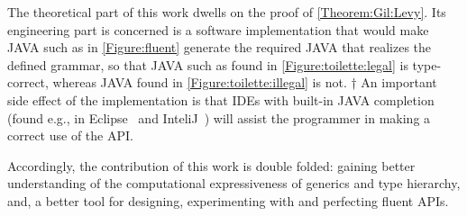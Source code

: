 The theoretical part of this work dwells on the proof of
  \cref{Theorem:Gil:Levy}.
Its engineering part is concerned is
  a software implementation that would make JAVA
  such as in \cref{Figure:fluent} generate
  the required \Java JAVA that realizes the
  defined grammar, so that JAVA such as
  found in \cref{Figure:toilette:legal} is type-correct,
  whereas JAVA found in \cref{Figure:toilette:illegal} is not.
†{%
An important side effect of the implementation is that IDEs with built-in JAVA
completion
 (found e.g., in Eclipse~\cite{Eclipse:2009} and InteliJ~\cite{Jetbrains:2003})
 will assist the programmer in making a correct use of the API.
 }

Accordingly, the contribution of this work is double folded:
  gaining better understanding of the computational expressiveness of
  \Java generics and type hierarchy, and, a better tool
  for designing, experimenting with and perfecting fluent APIs.
